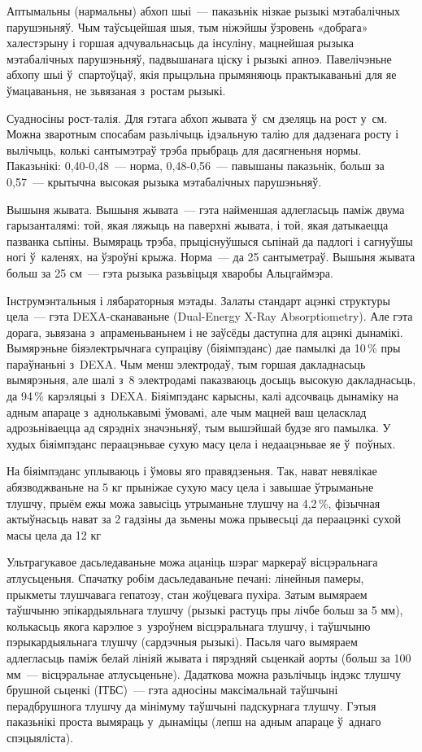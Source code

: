 Аптымальны (нармальны) абхоп шыі~--- паказьнік нізкае рызыкі мэтабалічных парушэньняў. Чым таўсьцейшая шыя, тым ніжэйшы ўзровень «добрага» халестэрыну і горшая адчувальнасьць да інсуліну, мацнейшая рызыка мэтабалічных парушэньняў, падвышанага ціску і рызыкі апноэ. Павелічэньне абхопу шыі ў~спартоўцаў, якія прыцэльна прымяняюць практыкаваньні для яе ўмацаваньня, не зьвязаная з~ростам рызыкі.

Суадносіны рост-талія. Для гэтага абхоп жывата ў~см дзеляць на рост у~см. Можна зваротным спосабам разьлічыць ідэальную талію для дадзенага росту і вылічыць, колькі сантымэтраў трэба прыбраць для дасягненьня нормы. Паказьнікі: 0,40-0,48~--- норма, 0,48-0,56~--- павышаны паказьнік, больш за 0,57~--- крытычна высокая рызыка мэтабалічных парушэньняў.

Вышыня жывата. Вышыня жывата~--- гэта найменшая адлегласьць паміж двума гарызанталямі: той, якая ляжыць на паверхні жывата, і той, якая датыкаецца пазванка сьпіны. Вымяраць трэба, прыціснуўшыся сьпінай да падлогі і сагнуўшы ногі ў~каленях, на ўзроўні крыжа. Норма~--- да 25 сантыметраў. Вышыня жывата больш за 25 см~--- гэта рызыка разьвіцьця хваробы Альцгаймэра.

Інструмэнтальныя і лябараторныя мэтады. Залаты стандарт ацэнкі структуры цела~--- гэта DEXA-сканаваньне (Dual-Energy X-Ray Absorptiometry). Але гэта дорага, зьвязана з~апраменьваньнем і не заўсёды даступна для ацэнкі дынамікі. Вымярэньне біяэлектрычнага супраціву (біяімпэданс) дае памылкі да 10\,\% пры параўнаньні з~DEXA. Чым менш электродаў, тым горшая дакладнасьць вымярэньня, але шалі з~8 электродамі паказваюць досыць высокую дакладнасьць, да 94\,\% карэляцыі з~DEXA. Біяімпэданс карысны, калі адсочваць дынаміку на адным апараце з~аднолькавымі ўмовамі, але чым мацней ваш целасклад адрозьніваецца ад сярэдніх значэньняў, тым вышэйшай будзе яго памылка. У худых біяімпэданс пераацэньвае сухую масу цела і недаацэньвае яе ў~поўных.

На біяімпэданс уплываюць і ўмовы яго правядзеньня. Так, нават невялікае абязводжваньне на 5 кг прыніжае сухую масу цела і завышае ўтрыманьне тлушчу, прыём ежы можа завысіць утрыманьне тлушчу на 4,2\,\%, фізычная актыўнасьць нават за 2 гадзіны да зьмены можа прывесьці да пераацэнкі сухой масы цела да 12 кг

Ультрагукавое дасьледаваньне можа ацаніць шэраг маркераў вісцэральнага атлусьценьня. Спачатку робім дасьледаваньне печані: лінейныя памеры, прыкметы тлушчавага гепатозу, стан жоўцевага пухіра. Затым вымяраем таўшчыню эпікардыяльнага тлушчу (рызыкі растуць пры лічбе больш за 5 мм), колькасьць якога карэлюе з~узроўнем вісцэральнага тлушчу, і таўшчыню пэрыкардыяльнага тлушчу (сардэчныя рызыкі). Пасьля чаго вымяраем адлегласьць паміж белай лініяй жывата і пярэдняй сьценкай аорты (больш за 100 мм~--- вісцэральнае атлусьценьне). Дадаткова можна разьлічыць індэкс тлушчу брушной сьценкі (ІТБС)~--- гэта адносіны максімальнай таўшчыні перадбрушнога тлушчу да мінімуму таўшчыні падскурнага тлушчу. Гэтыя паказьнікі проста вымяраць у~дынаміцы (лепш на адным апараце ў~аднаго спэцыяліста).

